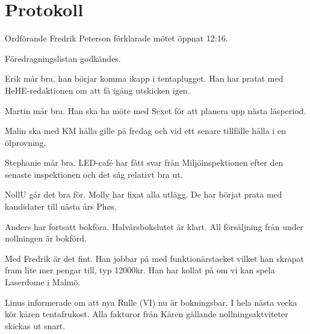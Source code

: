 \documentclass[10pt]{article}
\def\mo{Fredrik Peterson}
\begin{document}
\section*{Protokoll}
\begin{paragrafer}
Ordförande {\mo} förklarade mötet öppnat 12:16.

\valavmo

\valavms

\tosg

\ingaadj

\valavj

Föredragningslistan godkändes.


\begin{fyllnadsval} %
\end{fyllnadsval}

\begin{paragrafer}
Erik mår bra, han börjar komma ikapp i tentaplugget. Han har pratat med HeHE-redaktionen om att få igång utskicken igen.

Martin mår bra. Han ska ha möte med Sexet för att planera upp nästa läsperiod.

Malin ska med KM hålla gille på fredag och vid ett senare tillfälle hålla i en ölprovning.

Stephanie mår bra. LED-café har fått svar från Miljöinspektionen efter den senaste inspektionen och det såg relativt bra ut.

NollU går det bra för. Molly har fixat alla utlägg. De har börjat prata med kandidater till nästa års Phøs.

Anders har fortsatt bokföra. Halvårsbokslutet är klart. All försäljning från under nollningen är bokförd.

Med Fredrik är det fint. Han jobbar på med funktionärstacket vilket han skrapat fram lite mer pengar till, typ 12000kr. Han har kollat på om vi kan spela Laserdome i Malmö.

Linus informerade om att nya Rulle (VI) nu är bokningsbar. I hela nästa vecka kör kåren tentafrukost. Alla fakturor från Kåren gällande nollningsaktviteter skickas ut snart.


\end{paragrafer}
\end{paragrafer}
\end{document}
